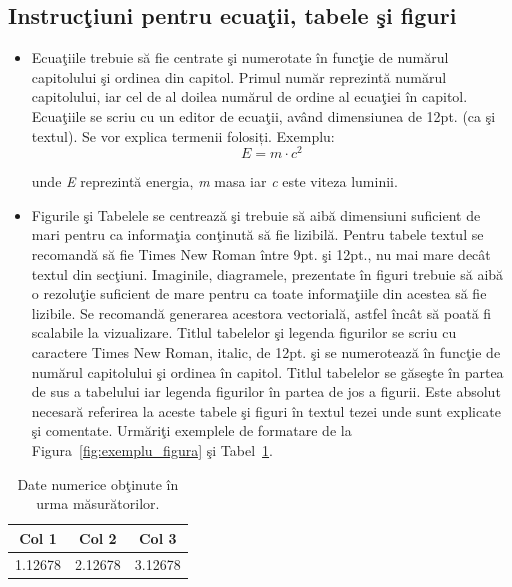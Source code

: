 \subsection*{Instruc\c{t}iuni pentru ecua\c{t}ii, tabele \c{s}i figuri}
\begin{itemize}
  \item Ecua\c{t}iile trebuie s\u{a} fie centrate \c{s}i numerotate \^{i}n func\c{t}ie de num\u{a}rul capitolului \c{s}i ordinea din capitol. Primul num\u{a}r reprezint\u{a} num\u{a}rul capitolului, iar cel de al doilea num\u{a}rul de ordine al ecua\c{t}iei \^{i}n capitol. Ecua\c{t}iile se scriu cu un editor de ecua\c{t}ii, av\^{a}nd dimensiunea de 12pt. (ca \c{s}i textul). Se vor explica termenii folosiți. Exemplu: 
  \begin{equation}
      E = m\cdot c^{2}
  \end{equation}
  
  unde \textit{E} reprezint\u{a} energia, \textit{m} masa iar \textit{c} este viteza luminii.          
  \item Figurile \c{s}i Tabelele se centreaz\u{a} \c{s}i trebuie s\u{a} aib\u{a} dimensiuni suficient de mari pentru ca informa\c{t}ia con\c{t}inut\u{a} s\u{a} fie lizibil\u{a}. Pentru tabele textul se recomand\u{a} s\u{a} fie Times New Roman \^{i}ntre 9pt. \c{s}i 12pt., nu mai mare dec\^{a}t textul din sec\c{t}iuni. Imaginile, diagramele, prezentate \^{i}n figuri trebuie s\u{a} aib\u{a} o rezolu\c{t}ie suficient de mare pentru ca toate informa\c{t}iile din acestea s\u{a} fie lizibile. Se recomand\u{a} generarea acestora vectorial\u{a}, astfel \^{i}ncât s\u{a} poat\u{a} fi scalabile la vizualizare. Titlul tabelelor \c{s}i legenda figurilor se scriu cu caractere Times New Roman, italic, de 12pt. \c{s}i se numeroteaz\u{a} \^{i}n func\c{t}ie de num\u{a}rul capitolului \c{s}i ordinea \^{i}n capitol. Titlul tabelelor se g\u{a}se\c{s}te \^{i}n partea de sus a tabelului iar legenda figurilor \^{i}n partea de jos a figurii. Este absolut necesar\u{a} referirea la aceste tabele \c{s}i figuri \^{i}n textul tezei unde sunt explicate \c{s}i comentate. Urm\u{a}ri\c{t}i exemplele de formatare de la Figura~\ref{fig:exemplu_figura} \c{s}i Tabel~\ref{tab:exemplu_tabel}.  
    \end{itemize}
 
\thispagestyle{empty}
\begin{table}[hbt!]
\centering
\caption{Date numerice ob\c{t}inute în urma m\u{a}sur\u{a}torilor.}
\label{tab:exemplu_tabel}
\begin{tabular}{|l|l|l|}
\hline
\multicolumn{1}{|c|}{\textbf{Col 1}} & \multicolumn{1}{c|}{\textbf{Col 2}} & \multicolumn{1}{c|}{\textbf{Col 3}} \\ \hline
1.12678                              & 2.12678                             & 3.12678                             \\ \hline
\end{tabular}
\end{table}

